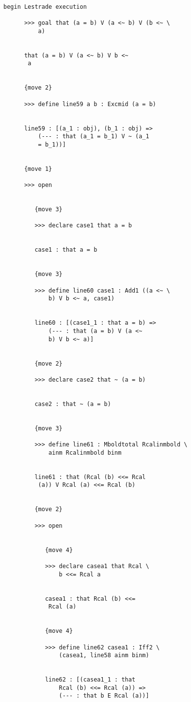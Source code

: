 \documentclass[12pt]{article}
\begin{document}
\begin{verbatim}

begin Lestrade execution

      >>> goal that (a = b) V (a <~ b) V (b <~ \
          a)


      that (a = b) V (a <~ b) V b <~ 
       a


      {move 2}

      >>> define line59 a b : Excmid (a = b)


      line59 : [(a_1 : obj), (b_1 : obj) => 
          (--- : that (a_1 = b_1) V ~ (a_1 
          = b_1))]


      {move 1}

      >>> open


         {move 3}

         >>> declare case1 that a = b


         case1 : that a = b


         {move 3}

         >>> define line60 case1 : Add1 ((a <~ \
             b) V b <~ a, case1)


         line60 : [(case1_1 : that a = b) => 
             (--- : that (a = b) V (a <~ 
             b) V b <~ a)]


         {move 2}

         >>> declare case2 that ~ (a = b)


         case2 : that ~ (a = b)


         {move 3}

         >>> define line61 : Mboldtotal Rcalinmbold \
             ainm Rcalinmbold binm


         line61 : that (Rcal (b) <<= Rcal 
          (a)) V Rcal (a) <<= Rcal (b)


         {move 2}

         >>> open


            {move 4}

            >>> declare casea1 that Rcal \
                b <<= Rcal a


            casea1 : that Rcal (b) <<= 
             Rcal (a)


            {move 4}

            >>> define line62 casea1 : Iff2 \
                (casea1, line58 ainm binm)


            line62 : [(casea1_1 : that 
                Rcal (b) <<= Rcal (a)) => 
                (--- : that b E Rcal (a))]



\end{verbatim}
\end{document}
